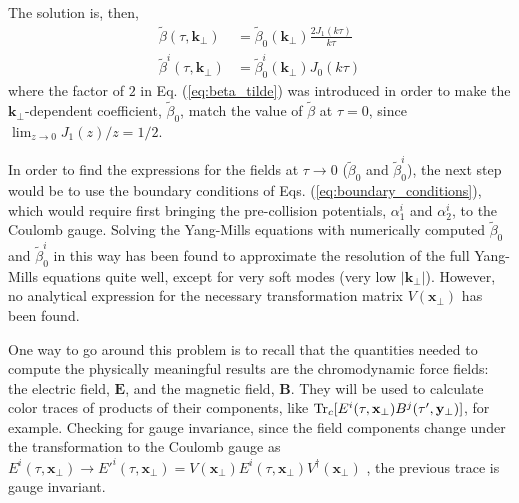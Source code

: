 The solution is, then,
\begin{subequations}
\begin{align}
	\tilde{\beta} (\tau, \mathbf{k}_\perp) &= \tilde{\beta}_0 (\mathbf{k}_\perp) \frac{2 J_1(k \tau)}{k \tau} \label{eq:beta_tilde}\\
	\tilde{\beta}^i (\tau, \mathbf{k}_\perp) &= \tilde{\beta}^i_0 (\mathbf{k}_\perp) J_0(k \tau) \label{eq:beta^i_tilde}
\end{align}
\end{subequations}
where the factor of $2$ in Eq. (\ref{eq:beta_tilde}) was introduced in order to make the $\mathbf{k}_\perp$-dependent coefficient, $\tilde{\beta}_0$, match the value of $\tilde{\beta}$ at $\tau=0$, since $\lim_{z \to 0} J_1(z)/z=1/2$. \cite{arfken2005mathematical}

In order to find the expressions for the fields at $\tau \to 0$ ($\tilde{\beta}_0$ and $\tilde{\beta}^i_0$), the next step would be to use the boundary conditions of Eqs. (\ref{eq:boundary_conditions}), which would require first bringing the pre-collision potentials, $\alpha^i_1$ and $\alpha^i_2$, to the Coulomb gauge. Solving the Yang-Mills equations with numerically computed $\tilde{\beta}_0$ and $\tilde{\beta}^i_0$ in this way has been found to approximate the resolution of the full Yang-Mills equations quite well, except for very soft modes (very low $|\mathbf{k}_\perp|$). \cite{Guerrero_Rodr_guez_2021,Blaizot:2010kh} However, no analytical expression for the necessary transformation matrix $V(\mathbf{x}_\perp)$ has been found.

One way to go around this problem is to recall that the quantities needed to compute the physically meaningful results are the chromodynamic force fields: the electric field, $\mathbf{E}$, and the magnetic field, $\mathbf{B}$. They will be used to calculate color traces of products of their components, like $\operatorname{Tr}_c [E^i(\tau, \mathbf{x}_\perp) B^j(\tau', \mathbf{y}_\perp) ]$, for example. Checking for gauge invariance, since the field components change under the transformation to the Coulomb gauge as $E^i (\tau, \mathbf{x}_\perp) \to E'^i(\tau, \mathbf{x}_\perp) = V(\mathbf{x}_\perp) E^i(\tau, \mathbf{x}_\perp) V^\dagger(\mathbf{x}_\perp)$ %
, the previous trace is gauge invariant. 

